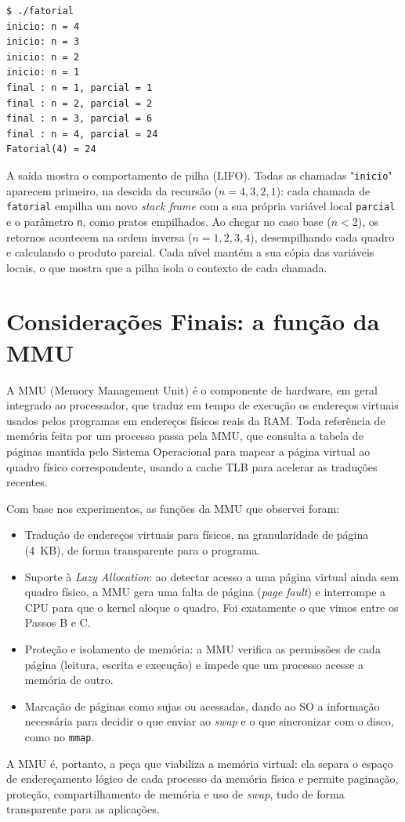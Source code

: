 \documentclass[11pt,a4paper]{article}
\begin{document}


\begin{lstlisting}[style=bashstyle]
$ ./fatorial
inicio: n = 4
inicio: n = 3
inicio: n = 2
inicio: n = 1
final : n = 1, parcial = 1
final : n = 2, parcial = 2
final : n = 3, parcial = 6
final : n = 4, parcial = 24
Fatorial(4) = 24
\end{lstlisting}

A saída mostra o comportamento de pilha (LIFO). Todas as chamadas "\texttt{inicio}" aparecem
primeiro, na descida da recursão ($n=4,3,2,1$): cada chamada de \texttt{fatorial} empilha um novo
\emph{stack frame} com a sua própria variável local \texttt{parcial} e o parâmetro \texttt{n}, como
pratos empilhados. Ao chegar no caso base ($n<2$), os retornos acontecem na ordem inversa
($n=1,2,3,4$), desempilhando cada quadro e calculando o produto parcial. Cada nível mantém a sua
cópia das variáveis locais, o que mostra que a pilha isola o contexto de cada chamada.

\section{Considerações Finais: a função da MMU}

A MMU (Memory Management Unit) é o componente de hardware, em geral integrado ao processador, que
traduz em tempo de execução os endereços virtuais usados pelos programas em endereços físicos reais
da RAM. Toda referência de memória feita por um processo passa pela MMU, que consulta a tabela de
páginas mantida pelo Sistema Operacional para mapear a página virtual ao quadro físico
correspondente, usando a cache TLB para acelerar as traduções recentes.

Com base nos experimentos, as funções da MMU que observei foram:
\begin{itemize}[nosep]
    \item Tradução de endereços virtuais para físicos, na granularidade de página (4~KB), de forma
    transparente para o programa.
    \item Suporte à \emph{Lazy Allocation}: ao detectar acesso a uma página virtual ainda sem quadro
    físico, a MMU gera uma falta de página (\emph{page fault}) e interrompe a CPU para que o kernel
    aloque o quadro. Foi exatamente o que vimos entre os Passos B e C.
    \item Proteção e isolamento de memória: a MMU verifica as permissões de cada página (leitura,
    escrita e execução) e impede que um processo acesse a memória de outro.
    \item Marcação de páginas como sujas ou acessadas, dando ao SO a informação necessária para
    decidir o que enviar ao \emph{swap} e o que sincronizar com o disco, como no \texttt{mmap}.
\end{itemize}

A MMU é, portanto, a peça que viabiliza a memória virtual: ela separa o espaço de endereçamento
lógico de cada processo da memória física e permite paginação, proteção, compartilhamento de memória
e uso de \emph{swap}, tudo de forma transparente para as aplicações.
\end{document}

